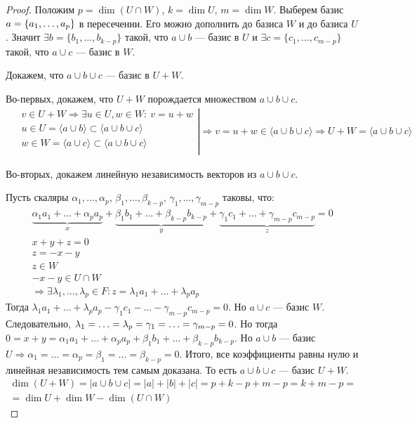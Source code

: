 \begin{proof}
Положим $p = \dim \left(U \cap W\right)$, $k = \dim U$, $m = \dim W$. Выберем базис $a \hm{=} \{ a_1, \ldots, a_p\}$ в пересечении. Его можно дополнить до базиса $W$ и до базиса $U$. Значит $\exists b = \{ b_1, \ldots, b_{k-p}\}$ такой, что $a\cup b$ --- базис в $U$ и $\exists c = \{ c_1, \ldots, c_{m-p}\}$ такой, что $a \cup c$ --- базис в $W$.

Докажем, что $a \cup b \cup c$ --- базис в $U+W$.

Во-первых, докажем, что $U+W$ порождается множеством $a \cup b \cup c$.
\begin{gather*}
\left.
\begin{aligned}
    &v \in U+W \Rightarrow \exists u \in U, w \in W\colon \ v = u+w\\
    &u \in U=\langle a \cup b\rangle \subset \langle a \cup b \cup c\rangle\\
    &w \in W=\langle a \cup c\rangle \subset \langle a \cup b \cup c\rangle\\
\end{aligned}
\right|
    \Rightarrow v = u + w \in \langle a \cup b \cup c\rangle 
    \Rightarrow U + W = \langle a \cup b \cup c\rangle
\end{gather*}

Во-вторых, докажем линейную независимость векторов из $a \cup b \cup c$.

Пусть скаляры $\alpha_1, \ldots, \alpha_p$, $\beta_1, \ldots, \beta_{k-p}$, $\gamma_1, \ldots, \gamma_{m-p}$ таковы, что:
\begin{gather*}
\underbrace{\alpha_1a_1+ \ldots +\alpha_pa_p}_x + \underbrace{\beta_1b_1+ \ldots +\beta_{k-p}b_{k-p}}_y + \underbrace{\gamma_1c_1 + \ldots + \gamma_{m-p}c_{m-p}}_z=0\\
x+y+z = 0\\
z = -x -y\\
z \in W\\
-x-y \in U\cap W\\
\Rightarrow \exists \lambda_1,\ldots, \lambda_p \in F \colon z = \lambda_1a_1+\ldots+\lambda_pa_p 
\end{gather*}
Тогда $\lambda_1a_1 + \ldots + \lambda_pa_p - \gamma_1c_1 - \ldots - \gamma_{m-p}c_{m-p} = 0$. Но $a \cup c$ --- базис $W$. Следовательно, $\lambda_1 \hm{=} \ldots = \lambda_p = \gamma_1 = \ldots = \gamma_{m-p} = 0$. Но тогда $0 = x+y = \alpha_1a_1 + \ldots + \alpha_pa_p + \beta_1b_1 + \ldots + \beta_{k-p}b_{k-p}$. Но $a\cup b$ --- базис $U \Rightarrow \alpha_1 = \ldots = \alpha_p = \beta_1 = \ldots = \beta_{k-p} = 0$. Итого, все коэффициенты равны нулю и линейная независимость тем самым доказана. То есть $a \cup b \cup c$ --- базис $U+W$. 
\begin{gather*}
    \dim \left(U+W\right) = |a\cup b \cup c| = |a| + |b| + |c| = p + k-p + m-p = k + m -p =\\
    =\dim U + \dim W - \dim\left(U\cap W\right)
\end{gather*}
\end{proof}


